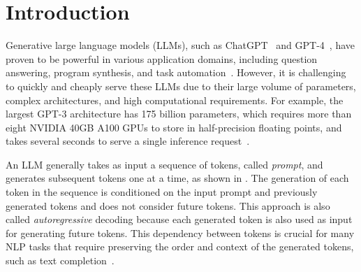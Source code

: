 \section{Introduction}
\label{sec:intro}
Generative large language models (LLMs), such as ChatGPT~\cite{brown2020language} and GPT-4~\cite{openai2023gpt4}, have proven to be powerful in various application domains, including question answering, program synthesis, and task automation~\cite{zhang2019pretraining, liu2021makes}.
However, it is challenging to quickly and cheaply serve these LLMs due to their large volume of parameters, complex architectures, and high computational requirements.
For example, the largest GPT-3 architecture has 175 billion parameters, which requires more than eight NVIDIA 40GB A100 GPUs to store in half-precision floating points, and takes several seconds to serve a single inference request~\cite{brown2020language}.

An LLM generally takes as input a sequence of tokens, called {\em prompt}, and generates subsequent tokens one at a time, as shown in . 
The generation of each token in the sequence is conditioned on the input prompt and previously generated tokens and does not consider future tokens.
This approach is also called {\em autoregressive} decoding because each generated token is also used as input for generating future tokens.
This dependency between tokens is crucial for many NLP tasks that require preserving the order and context of the generated tokens, such as text completion~\cite{yu2022orca}.


